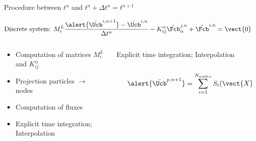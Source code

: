 \begin{frame}{Procedure between $t^n$ and $t^n + \Delta t^n=t^{n+1}$}
  \begin{footnotesize}
    \begin{equation*}
      \text{Discrete system: }M^L_{i} \frac{\alert{\bar{\Ucb}^{i,n+1}} - \bar{\Ucb}^{i,n}}{\Delta t^n}  - K_{ij}^\alpha \bar{\Fcb}^{j,n}_{\alpha}  + \hat{\Fcb}^{i,n}=  \vect{0}
    \end{equation*}
    \begin{columns}
      \begin{column}{0.4\textwidth}
        \begin{itemize}
        \item[(1)] Computation of matrices $M_i^L$ and $K_{ij}^\alpha$
        \item[(2)] Projection particles $\rightarrow$ nodes
        \item[(3)] Computation of fluxes
        \item[(4)] Explicit time integration; Interpolation
        \end{itemize}
      \end{column}
      \vrule{}
      \begin{column}{0.6\textwidth}
        \begin{block}{Explicit time integration; Interpolation}
          
          \begin{columns}
            \begin{column}{0.4\textwidth}
            \end{column}
            \begin{column}{0.55\textwidth}
              \begin{equation*}
                \alert{\bar{\Ucb}^{p,n+1}}=\sum_{i=1}^{N_{nodes}} S_{i}(\vect{X}^{p}) \bar{\Ucb}^{i,n+1}
              \end{equation*}
            \end{column}
          \end{columns}
        \end{block}
      \end{column}
    \end{columns}
  \end{footnotesize}
\end{frame}

